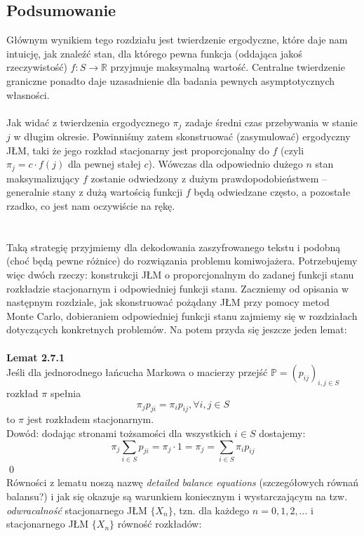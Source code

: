\documentclass[a4paper]{article}
\begin{document}
\subsection{Podsumowanie}
Głównym wynikiem tego rozdziału jest twierdzenie ergodyczne, które daje nam intuicję, jak znaleźć stan, dla którego pewna funkcja (oddająca jakoś rzeczywistość) $f: S \rightarrow \mathbb{R}$ przyjmuje maksymalną wartość. Centralne twierdzenie graniczne ponadto daje uzasadnienie dla badania pewnych asymptotycznych własności.\\\\
Jak widać z twierdzenia ergodycznego $\pi_j$ zadaje średni czas przebywania w stanie $j$ w długim okresie. Powinniśmy zatem skonstruować (zasymulować) ergodyczny JŁM, taki że jego rozkład stacjonarny jest proporcjonalny do $f$ (czyli $\pi_j = c \cdot f(j)$ dla pewnej stałej $c$). Wówczas dla odpowiednio dużego $n$ stan maksymalizujący $f$ zostanie odwiedzony z dużym prawdopodobieństwem – generalnie stany z dużą wartością funkcji $f$ będą odwiedzane często, a pozostałe rzadko, co jest nam oczywiście na rękę.
\\\\
\\Taką strategię przyjmiemy dla dekodowania zaszyfrowanego tekstu i podobną (choć będą pewne różnice) do rozwiązania problemu komiwojażera.
Potrzebujemy więc dwóch rzeczy: konstrukcji JŁM o proporcjonalnym do zadanej funkcji stanu rozkładzie stacjonarnym i odpowiedniej funkcji stanu. Zaczniemy od opisania w następnym rozdziale, jak skonstruować pożądany JŁM przy pomocy metod Monte Carlo, dobieraniem odpowiedniej funkcji stanu zajmiemy się w rozdziałach dotyczących konkretnych problemów. Na potem przyda się jeszcze jeden lemat:
\\\\
\textbf{Lemat 2.7.1}\\
Jeśli dla jednorodnego łańcucha Markowa o macierzy przejść $\mathbb{P} = (p_{ij})_{i, j \in S}$ rozkład $\pi$ spełnia $$\pi_j p_{ji} = \pi_i p_{ij},  \forall i,j \in S$$ to $\pi$ jest rozkładem stacjonarnym.\\
Dowód: dodając stronami  tożsamości dla wszystkich $i \in S$ dostajemy: 
$$\pi_j \sum\limits_{i \in S} p_{ji} = \pi_j \cdot 1 = \pi_j = \sum\limits_{i \in S} \pi_i p_{ij}$$ \qed\\
Równości z lematu noszą nazwę \textit{detailed balance equations} (szczegółowych równań balansu?) i jak się okazuje są warunkiem koniecznym i wystarczającym na tzw. \textit{odwracalność} stacjonarnego JŁM $\{X_n\}$, tzn. dla każdego $n = 0,1,2,...$ i stacjonarnego JŁM $\{X_n\}$ równość rozkładów:
\end{document}

